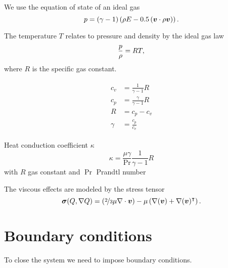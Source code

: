 We use the equation of state of an ideal gas
\begin{equation}
  \label{eq:eos}
  p = (\gamma - 1) \left(\rho E - 0.5 \left(\bm{v} \cdot \rho \bm{v} \right) \right).
\end{equation}

The temperature $T$ relates to pressure and density by the ideal gas law
\begin{equation}
  \label{eq:temperature}
 \frac{p}{\rho} = RT,
\end{equation}
where $R$ is the specific gas constant.

\begin{align}
  \begin{split}
  c_v &= \frac{1}{\gamma - 1} R \\
  c_p &= \frac{\gamma}{\gamma - 1} R\\
  R &= c_p - c_v\\
  \gamma &= \frac{c_p}{c_v}
  \end{split}
\end{align}

Heat conduction coefficient $\kappa$
\begin{equation}
  \label{eq:heat-conduction-coeff}
  \kappa = \frac{\mu \gamma}{\Pr} \frac{1}{\gamma - 1} R
\end{equation}
with $R$ gas constant and $\Pr$ Prandtl number


The viscous effects are modeled by the stress tensor
\begin{equation}
  \label{eq:stress-tensor}
  \bm{\sigma}(Q, \nabla Q) = \left(\nicefrac{2}{3} \mu \nabla \cdot \bm{v} \right) -
  \mu \left( \nabla (\bm{v}) + \nabla ( \bm{v} )^\intercal \right).
\end{equation}

\section{Boundary conditions}
To close the system we need to impose boundary conditions.


